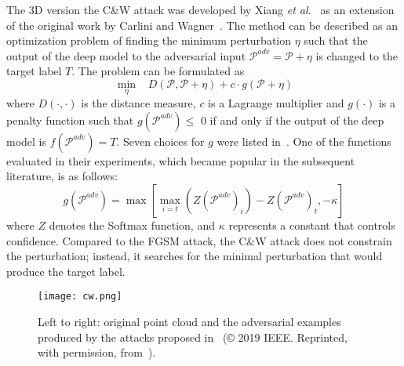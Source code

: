 \documentclass{ieeeaccess}
\def\etal{\textit{et al.}}
\begin{document}
The 3D version the C\&W attack was developed by Xiang \etal~\cite{xiang2019generating} as an extension of the original work by Carlini and Wagner~\cite{carlini2017towards}. The method can be described as an optimization problem of finding the minimum perturbation $\eta$ such that the output of the deep model to the adversarial input $\mathcal{P}^{adv}=\mathcal{P} + \eta$ is changed to the target label $T$. The problem can be formulated as 
\begin{equation}
\min\limits_\eta  \;\;\;    D (\mathcal{P} , \mathcal{P} + \eta) + c \cdot g(\mathcal{P} + \eta)  %
\label{eq:30}
\end{equation}
where $D(\cdot,\cdot)$ is the distance measure, %
$c$ is a Lagrange multiplier and $g(\cdot)$ is a penalty function such that $g(\mathcal{P}^{adv})\leq$ 0 if and only if the output of the deep model is $f(\mathcal{P}^{adv})=T$. %
Seven choices for $g$ were listed in~\cite{carlini2017towards}. One of the functions evaluated in their experiments, which became popular in the subsequent literature, is as follows:
\begin{equation}
    g(\mathcal{P}^{adv}) = \max\left[\max\limits_{i=t}(Z(\mathcal{P}^{adv})_i)-Z(\mathcal{P}^{adv})_t , -\kappa\right]
\label{eq:4}
\end{equation}
where $Z$ denotes the Softmax function, and $\kappa$ represents a constant that controls confidence.
Compared to the FGSM attack, the C\&W attack does not constrain the perturbation; instead, it searches for the minimal perturbation that would produce the target label.

\begin{figure*}
    \centering
    \texttt{[image: cw.png]}
    \caption{Left to right: original point cloud and the adversarial examples produced by the attacks proposed in~\cite{xiang2019generating} (© 2019 IEEE. Reprinted, with permission, from~\cite{xiang2019generating}).}
    \label{fig_CW}
\end{figure*}
\end{document}
